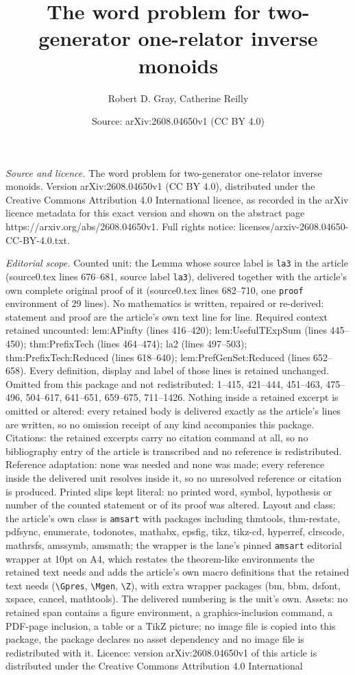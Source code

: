 \documentclass[10pt,a4paper]{amsart}
\title[The word problem for two-generator one-relator inverse monoi]{The word problem for two-generator one-relator inverse monoids}
\author{Robert D. Gray, Catherine Reilly}
\date{Source: arXiv:2608.04650v1 (CC BY 4.0)}
\begin{document}
\maketitle

\noindent\emph{Source and licence.} The word problem for two-generator one-relator inverse monoids. Version arXiv:2608.04650v1 (CC BY 4.0), distributed under the Creative Commons Attribution 4.0 International licence, as recorded in the arXiv licence metadata for this exact version and shown on the abstract page https://arxiv.org/abs/2608.04650v1. Full rights notice: licenses/arxiv-2608.04650-CC-BY-4.0.txt.\par\smallskip

\noindent\textit{Editorial scope.} Counted unit: the Lemma whose source label is \texttt{la3} in the article (source0.tex lines 676--681, source label \texttt{la3}), delivered together with the article's own complete original proof of it (source0.tex lines 682--710, one \texttt{proof} environment of 29 lines). No mathematics is written, repaired or re-derived: statement and proof are the article's own text line for line. Required context retained uncounted: lem:APinfty (lines 416--420); lem:UsefulTExpSum (lines 445--450); thm:PrefixTech (lines 464--474); la2 (lines 497--503); thm:PrefixTech:Reduced (lines 618--640); lem:PrefGenSet:Reduced (lines 652--658). Every definition, display and label of those lines is retained unchanged. Omitted from this package and not redistributed: 1--415, 421--444, 451--463, 475--496, 504--617, 641--651, 659--675, 711--1426. Nothing inside a retained excerpt is omitted or altered: every retained body is delivered exactly as the article's lines are written, so no omission receipt of any kind accompanies this package. Citations: the retained excerpts carry no citation command at all, so no bibliography entry of the article is transcribed and no reference is redistributed. Reference adaptation: none was needed and none was made; every reference inside the delivered unit resolves inside it, so no unresolved reference or citation is produced. Printed slips kept literal: no printed word, symbol, hypothesis or number of the counted statement or of its proof was altered. Layout and class: the article's own class is \texttt{amsart} with packages including thmtools, thm-restate, pdfsync, enumerate, todonotes, mathabx, epsfig, tikz, tikz-cd, hyperref, clrscode, mathrsfs, amssymb, amsmath; the wrapper is the lane's pinned \texttt{amsart} editorial wrapper at 10pt on A4, which restates the theorem-like environments the retained text needs and adds the article's own macro definitions that the retained text needs (\texttt{\textbackslash Gpres}, \texttt{\textbackslash Mgen}, \texttt{\textbackslash Z}), with extra wrapper packages (bm, bbm, dsfont, xspace, cancel, mathtools). The delivered numbering is the unit's own. Assets: no retained span contains a figure environment, a graphics-inclusion command, a PDF-page inclusion, a table or a TikZ picture; no image file is copied into this package, the package declares no asset dependency and no image file is redistributed with it. Licence: version arXiv:2608.04650v1 of this article is distributed under the Creative Commons Attribution 4.0 International 
\end{document}
